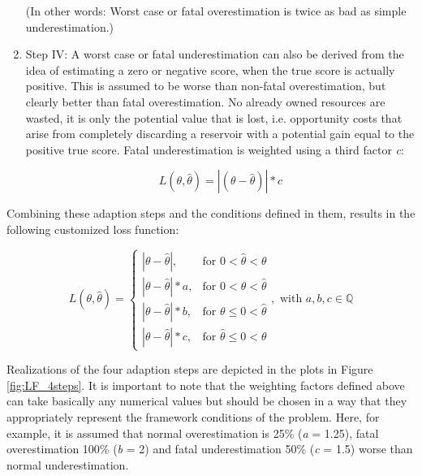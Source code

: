 \begin{enumerate}
		(In other words: Worst case or fatal overestimation is twice as bad as simple underestimation.)
		
		\item Step IV: A worst case or fatal underestimation can also be derived from the idea of estimating a zero or negative score, when the true score is actually positive. This is assumed to be worse than non-fatal overestimation, but clearly better than fatal overestimation. No already owned resources are wasted, it is only the potential value that is lost, i.e. opportunity costs that arise from completely discarding a reservoir with a potential gain equal to the positive true score. Fatal underestimation is weighted using a third factor \textit{c}:
				
		\begin{equation}\label{eq:LF_IV}
		L(\theta,\hat{\theta}) = |(\theta-\hat{\theta})|*c
		\end{equation}
		
	\end{enumerate}
	
	Combining these adaption steps and the conditions defined in them, results in the following customized loss function:
	
	\begin{equation}\label{eq:LF_final}
	L(\theta,\hat{\theta}) =
	\begin{cases}
	|\theta - \hat{\theta}|, & \text{for } 0<\hat{\theta}<\theta  \\
	|\theta-\hat{\theta}|*a, & \text{for } 0<\theta<\hat{\theta} \\
	|\theta-\hat{\theta}|*b, & \text{for } \theta\leq0<\hat{\theta} \\
	|\theta-\hat{\theta}|*c, & \text{for } \hat{\theta}\leq0<\theta 
	\end{cases},
	\text{ with } a,b,c \in \mathbb{Q}
	\end{equation}
	  
	Realizations of the four adaption steps are depicted in the plots in Figure \ref{fig:LF_4steps}. It is important to note that the weighting factors defined above can take basically any numerical values but should be chosen in a way that they appropriately represent the framework conditions of the problem. Here, for example, it is assumed that normal overestimation is 25\% (\textit{a} = 1.25), fatal overestimation 100\% (\textit{b} = 2) and fatal underestimation 50\% (\textit{c} = 1.5) worse than normal underestimation. 
	
